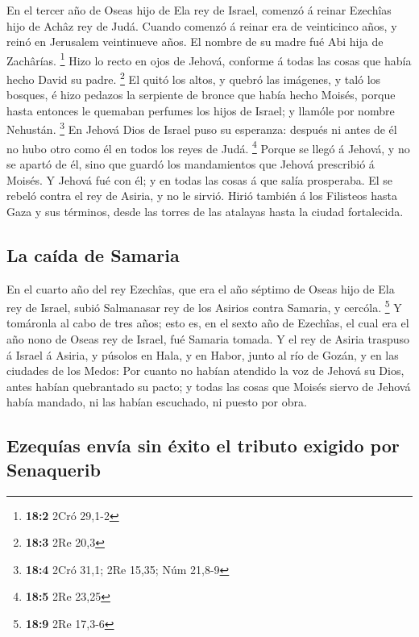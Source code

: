  En el tercer año de Oseas hijo de Ela rey de Israel,
comenzó á reinar Ezechîas hijo de Achâz rey de Judá.  Cuando
comenzó á reinar era de veinticinco años, y reinó en Jerusalem
veintinueve años. El nombre de su madre fué Abi hija de Zachârías.
\footnote{\textbf{18:2} 2Cró 29,1-2}  Hizo lo recto en ojos
de Jehová, conforme á todas las cosas que había hecho David su padre.
\footnote{\textbf{18:3} 2Re 20,3}  El quitó los altos, y
quebró las imágenes, y taló los bosques, é hizo pedazos la serpiente de
bronce que había hecho Moisés, porque hasta entonces le quemaban
perfumes los hijos de Israel; y llamóle por nombre Nehustán. \footnote{\textbf{18:4}
  2Cró 31,1; 2Re 15,35; Núm 21,8-9}  En Jehová Dios de
Israel puso su esperanza: después ni antes de él no hubo otro como él en
todos los reyes de Judá. \footnote{\textbf{18:5} 2Re 23,25} 
Porque se llegó á Jehová, y no se apartó de él, sino que guardó los
mandamientos que Jehová prescribió á Moisés.  Y Jehová fué
con él; y en todas las cosas á que salía prosperaba. El se rebeló contra
el rey de Asiria, y no le sirvió.  Hirió también á los
Filisteos hasta Gaza y sus términos, desde las torres de las atalayas
hasta la ciudad fortalecida.

\hypertarget{la-cauxedda-de-samaria}{%
\subsection{La caída de Samaria}\label{la-cauxedda-de-samaria}}

 En el cuarto año del rey Ezechîas, que era el año séptimo
de Oseas hijo de Ela rey de Israel, subió Salmanasar rey de los Asirios
contra Samaria, y cercóla. \footnote{\textbf{18:9} 2Re 17,3-6}
 Y tomáronla al cabo de tres años; esto es, en el sexto año
de Ezechîas, el cual era el año nono de Oseas rey de Israel, fué Samaria
tomada.  Y el rey de Asiria traspuso á Israel á Asiria, y
púsolos en Hala, y en Habor, junto al río de Gozán, y en las ciudades de
los Medos:  Por cuanto no habían atendido la voz de Jehová
su Dios, antes habían quebrantado su pacto; y todas las cosas que Moisés
siervo de Jehová había mandado, ni las habían escuchado, ni puesto por
obra.

\hypertarget{ezequuxedas-envuxeda-sin-uxe9xito-el-tributo-exigido-por-senaquerib}{%
\subsection{Ezequías envía sin éxito el tributo exigido por
Senaquerib}\label{ezequuxedas-envuxeda-sin-uxe9xito-el-tributo-exigido-por-senaquerib}}

